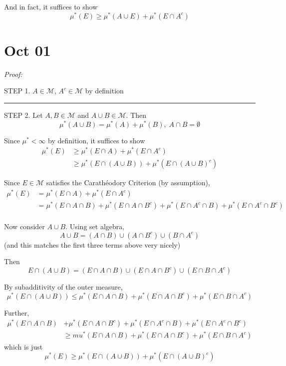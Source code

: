 \documentclass[12pt]{report}
\newcommand{\M}{\mathcal{M}}
\renewcommand{\div}{\vspace*{10pt}\hrule\vspace*{10pt}}
\newenvironment*{tbox}[2][gray]{
    \begin{tcolorbox}[
        parbox=false,
        colback=#1!5!white,
        colframe=#1!75!black,
        breakable,
        title={#2}
    ]}
    {\end{tcolorbox}}
\begin{document}
        And in fact, it suffices to show 
        \[\mu^*(E) \geq \mu^*(A \cup E) + \mu^*(E\cap A^c)\] 


\section*{Oct 01}

    \begin{tbox}{\textbf{Carathéodory Procedure:} If $\mu^*$ is an outer measure and $\M$ are $\mu^*$-measurable sets, then $\M$ is a $\sigma$-algebra and $\mu^*\big\vert_{\M}$ is a measure on $\M$}
        
        \emph{Proof:} 

        STEP 1. $A \in \M$, $A^c \in \M$ by definition

        \div 

        STEP 2. Let $A, B \in \M$ and $A \cup B \in \M$. Then 
        \[\mu^*(A \cup B) = \mu^*(A) + \mu^*(B), \; A \cap B = \emptyset\]

        Since $\mu^* < \infty$ by definition, it suffices to show 
        \begin{align*}
            \mu^*(E) &\geq \mu^*(E \cap A) + \mu^*(E \cap A^c)\\ 
            &\geq \mu^*(E \cap (A \cup B)) + \mu^*(E \cap (A \cup B)^c)
        \end{align*}

        Since $E \in \M$ satisfies the Carathéodory Criterion (by assumption), 
        \begin{align*}
            \mu^*(E) &= \mu^*(E \cap A) + \mu^*(E \cap A^c)\\ 
            &= \mu^*(E \cap A \cap B) + \mu^*(E \cap A \cap B^c) + \mu^*(E \cap A^c \cap B) + \mu^*(E \cap A^c \cap B^c)\\
        \end{align*}
        
        Now consider $A \cup B$. Using set algebra, 
        \[A \cup B = (A \cap B) \cup (A \cap B^c) \cup (B \cap A^c)\]
        (and this matches the first three terms above very nicely)

        Then 
        \[E \cap (A \cup B) = (E \cap A \cap B) \cup (E \cap A \cap B^c) \cup (E \cap B \cap A^c)\]
        
        By subadditivity of the outer measure, 
        \[\mu^*(E \cap (A \cup B)) \leq \mu^*(E \cap A \cap B) + \mu^*(E \cap A \cap B^c) + \mu^*(E \cap B \cap A^c)\]

        Further, 
        \begin{align*}
            \mu^*(E \cap A \cap B) &+ \mu^*(E \cap A \cap B^c) + \mu^*(E \cap A^c \cap B) + \mu^*(E \cap A^c \cap B^c)\\ 
                &\geq mu^*(E \cap A \cap B) + \mu^*(E \cap A \cap B^c) + \mu^*(E \cap B \cap A^c)
        \end{align*}
        which is just 
        \[\mu^*(E) \geq \mu^*(E \cap (A\cup B)) + \mu^*(E \cap (A \cup B)^c)\]


\end{tbox}
\end{document}
